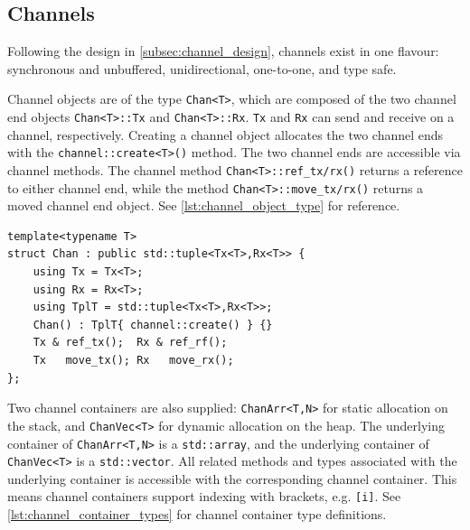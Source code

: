 \subsection{Channels}


Following the design in \cref{subsec:channel_design}, channels exist in one flavour: synchronous and unbuffered, unidirectional, one\hyp{}to\hyp{}one, and type safe. 

Channel objects are of the type \lstinline[style={CustomC++}]|Chan<T>|, which are composed of the two channel end objects \lstinline[style={CustomC++}]|Chan<T>::Tx| and \lstinline[style={CustomC++}]|Chan<T>::Rx|. \lstinline[style={CustomC++}]|Tx| and \lstinline[style={CustomC++}]|Rx| can send and receive on a channel, respectively. Creating a channel object allocates the two channel ends with the \lstinline[style={CustomC++}]|channel::create<T>()| method. The two channel ends are accessible via channel methods. The channel method \lstinline[style={CustomC++}]|Chan<T>::ref_tx/rx()| returns a reference to either channel end, while the method \lstinline[style={CustomC++}]|Chan<T>::move_tx/rx()| returns a moved channel end object. See \cref{lst:channel_object_type} for reference.

\begin{lstfloat}
\begin{lstlisting}[caption={Channel object type.}, label={lst:channel_object_type}, style={CustomC++}, xleftmargin={2em}]
template<typename T>
struct Chan : public std::tuple<Tx<T>,Rx<T>> {
    using Tx = Tx<T>;
    using Rx = Rx<T>;
    using TplT = std::tuple<Tx<T>,Rx<T>>;
    Chan() : TplT{ channel::create() } {}
    Tx & ref_tx();  Rx & ref_rf();
    Tx   move_tx(); Rx   move_rx();
};
\end{lstlisting}
\end{lstfloat}

Two channel containers are also supplied: \lstinline[style={CustomC++}]|ChanArr<T,N>| for static allocation on the stack, and \lstinline[style={CustomC++}]|ChanVec<T>| for dynamic allocation on the heap. The underlying container of \lstinline[style={CustomC++}]|ChanArr<T,N>| is a \lstinline[style={CustomC++}]|std::array|, and the underlying container of \lstinline[style={CustomC++}]|ChanVec<T>| is a \lstinline[style={CustomC++}]|std::vector|. All related methods and types associated with the underlying container is accessible with the corresponding channel container. This means channel containers support indexing with brackets, e.g. \lstinline[style={CustomC++}]|[i]|. See \cref{lst:channel_container_types} for channel container type definitions.

